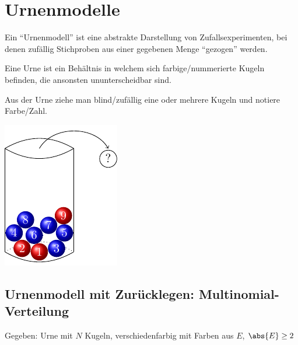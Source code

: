 \section{Urnenmodelle}

Ein ``Urnenmodell'' ist eine abstrakte Darstellung von Zufallsexperimenten, bei denen zufällig Stichproben aus einer gegebenen Menge ``gezogen'' werden.
\begin{*definition}[Urne]
	Eine Urne ist ein Behältnis in welchem sich farbige/nummerierte Kugeln befinden, die ansonsten ununterscheidbar sind.
\end{*definition}
Aus der Urne ziehe man blind/zufällig eine oder mehrere Kugeln und notiere Farbe/Zahl.

\begin{center}
    \includegraphics{../../Material/urne_mit_kugeln.pdf}
\end{center}

\subsection{Urnenmodell mit Zurücklegen: Multinomial-Verteilung}

Gegeben: Urne mit $N$ Kugeln, verschiedenfarbig mit Farben aus $E$, $\abs{E} \ge 2$ 

